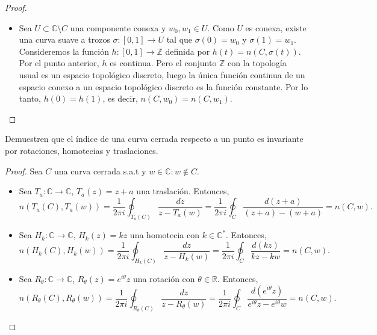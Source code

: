 \documentclass{article}
\newcommand{\R}{\mathbb{R}}
\newcommand{\Z}{\mathbb{Z}}
\newcommand{\C}{\mathbb{C}}
\newenvironment{theorem}[2][Ejercicio]{\begin{trivlist}
\item[\hskip\labelsep{\bfseries #1}\hskip\labelsep{\bfseries #2.}]}{\end{trivlist}}
\begin{document}
\begin{proof}
\begin{itemize}
\begin{align*}
                  |z-w_0|                        & \geq d
              \end{align*}
              Se tiene que \begin{align*}
                  |h(w) - h(w_0)| & \leq \frac{|w - w_0|}{2\pi} \oint_C \frac{|dz|}{(d - |w - w_0|)d} \\
                                  & = \frac{|w - w_0| L(C)}{2\pi d (d - |w - w_0|)}
              \end{align*}
        \item Sea \( U \subset \C \setminus C \) una componente conexa y \( w_0, w_1 \in U \). Como \( U \) es conexa, existe una curva suave a trozos \( \sigma : [0, 1] \to U \) tal que \( \sigma(0) = w_0 \) y \( \sigma(1) = w_1 \).
              Consideremos la función \( h : [0, 1] \to \Z \) definida por \( h(t) = n(C, \sigma(t)) \). Por el punto anterior, \( h \) es continua. Pero el conjunto \( \Z \) con la topología usual es un espacio topológico discreto, luego la única función continua de un espacio conexo a un espacio topológico discreto es la función constante.
              Por lo tanto, \( h(0) = h(1) \), es decir, \( n(C, w_0) = n(C, w_1) \).
    \end{itemize}
\end{proof}

\vspace{0.25in}

\begin{theorem}{2}
    Demuestren que el índice de una curva cerrada respecto a un punto es invariante por rotaciones, homotecias y traslaciones.
\end{theorem}

\begin{proof}
    Sea \( C \) una curva cerrada s.a.t y \( w \in \C : w \notin C \).\begin{itemize}
        \item Sea \( T_a : \C \to \C \), \( T_a(z) = z + a \) una traslación. Entonces,
              \[
                  n(T_a(C), T_a(w)) = \frac{1}{2\pi i} \oint_{T_a(C)} \frac{dz}{z - T_a(w)} = \frac{1}{2\pi i} \oint_{C} \frac{d(z + a)}{(z + a) - (w + a)} = n(C, w).
              \]
        \item Sea \( H_k : \C \to \C \), \( H_k(z) = kz \) una homotecia con \( k \in \C^* \). Entonces,
              \[
                  n(H_k(C), H_k(w)) = \frac{1}{2\pi i} \oint_{H_k(C)} \frac{dz}{z - H_k(w)} = \frac{1}{2\pi i} \oint_{C} \frac{d(kz)}{kz - kw} = n(C, w).
              \]
        \item Sea \( R_\theta : \C \to \C \), \( R_\theta(z) = e^{i\theta}z \) una rotación con \( \theta \in \R \). Entonces,
              \[
                  n(R_\theta(C), R_\theta(w)) = \frac{1}{2\pi i} \oint_{R_\theta(C)} \frac{dz}{z - R_\theta(w)} = \frac{1}{2\pi i} \oint_{C} \frac{d(e^{i\theta}z)}{e^{i\theta}z - e^{i\theta}w} = n(C, w).
              \]
    \end{itemize}
\end{proof}
\end{document}
